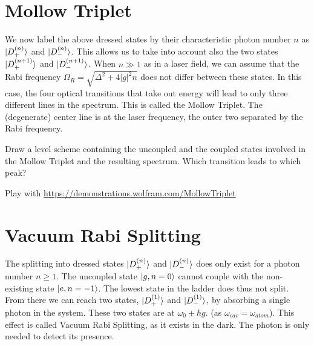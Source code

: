 \section{Mollow Triplet}

We now label the above dressed states by their characteristic photon number $n$ as $\ket{D_+^{(n)}}$ and $\ket{D_-^{(n)}}$. This allows us to take into account also the two states $\ket{D_+^{(n+1)}}$ and $\ket{D_-^{(n+1)}}$. 
When $n \gg 1$ as in a laser field,  we can assume that the Rabi frequency $\Omega_R = \sqrt{\Delta^2 + 4 |g|^2 n}$ does not differ between these states. In this case, the four optical transitions that take out energy will lead to   only three different lines in the spectrum. This is called the Mollow Triplet. The (degenerate) center line is at the laser frequency, the outer two separated by the Rabi frequency.





\begin{questions}
\item Draw a level scheme containing the uncoupled and the coupled states involved in the Mollow Triplet and the resulting spectrum. Which transition leads to which peak?

\item Play with \href{https://demonstrations.wolfram.com/MollowTriplet/} {https://demonstrations.wolfram.com/MollowTriplet} 

\end{questions}

\section{Vacuum Rabi Splitting}

The splitting into dressed states $\ket{D_+^{(n)}}$ and $\ket{D_-^{(n)}}$ does only exist for a photon number $n \ge 1$. The uncoupled state $\ket{g, n=0}$ cannot couple with the non-existing state   $\ket{e, n = -1}$. The lowest state in the ladder does thus not split. From there we can reach two states,  $\ket{D_+^{(1)}}$ and $\ket{D_-^{(1)}}$,
by absorbing a single photon in the system. These two states are at  $\omega_0 \pm \hbar g$. (as $\omega_{cav} = \omega_{atom}$). This effect is called Vacuum Rabi Splitting, as it exists in the dark. The photon is only needed to detect its presence.


